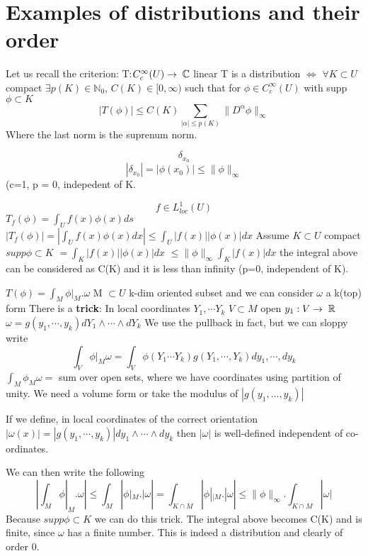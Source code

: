 \section{Examples of distributions and their order}
Let us recall the criterion:
T:$C^{\infty}_{c}(U) \rightarrow \; \mathbb{C}$ linear 
T is a distribution $\iff$ $\forall K \subset U$ compact 
$\exists p(K) \in \mathbb{N}_0$, $C(K) \in [0,\infty)$ such that for 
$\phi \in C^{\infty}_{c}(U)$ with supp$\phi \subset K$
\begin{equation*}
 |T(\phi)| \leq C(K) \sum_{|\alpha|\leq p(K)}\|D^{\alpha}\phi\|_{\infty}
\end{equation*}
Where the last norm is the suprenum norm. 
\begin{ex}
 \begin{equation*}
  \delta_{x_{0}} 
 \end{equation*}
\begin{equation*}
 |\delta_{x_{0}}| = |\phi(x_{0})| \leq \|\phi \|_{\infty}
\end{equation*}
(c=1, p = 0, indepedent of K.
\end{ex}
\begin{ex}
 \begin{equation*}
  f \in L^1_{loc}(U) 
 \end{equation*}
$T_f(\phi) = \int_U f(x) \phi (x) ds$
$|T_f(\phi)| = |\int_U f(x) \phi(x) dx| \leq \int_U|f(x)||\phi(x)|dx$ 
Assume $K \subset U$ compact 
$supp \phi \subset K$ $=\int_K|f(x)||\phi(x)|dx$
$\leq \|\phi\|_\infty \int_K |f(x)|dx$
the integral above can be considered as C(K) and it is less than infinity (p=0, independent of K).
\end{ex}
\begin{ex}
 $T(\phi) = \int_M \phi|_M . \omega$
M $\subset U$ k-dim oriented subset and we can consider $\omega$ a k(top) form
There is a \textbf{trick}: In local coordinates $Y_1,\cdots Y_k$ $V\subset M$ open $y_1: V 
\rightarrow \; \mathbb{R}$
$\omega = g(y_1,\cdots, y_k)dY_1\wedge \cdots \wedge dY_k$
We use the pullback in fact, but we can sloppy write 
\begin{equation*}
 \int_V \phi|_M \omega = \int_V \phi(Y_1 \cdots Y_k)g(Y_1,\cdots,Y_k)dy_1,\cdots, dy_k
\end{equation*}
$\int_M \phi_M \omega =$ sum over open sets, where we have coordinates using partition of unity. We need a volume form or 
take the modulus of $|g(y_1,...,y_k)|$
\begin{rm}
 If we define, in local coordinates of the correct orientation 
$|\omega(x)|=|g(y_1,\cdots,y_k)|dy_1 \wedge \cdots \wedge dy_k$
then $|\omega|$ is well-defined independent of co-ordinates.
\end{rm}
We can then write the following 
\begin{equation*}
 |\int_M \phi|_M . \omega| \leq \int_M|\phi|_M . |\omega| = \int_{K \cap M} |\phi|_{|M}.|\omega| 
\leq \|\phi\|_\infty . \int_{K \cap M} |\omega|
\end{equation*}
Because $supp \phi \subset K$ we can do this trick.
The integral above becomes C(K) and is finite, since $\omega$ has a finite number.
This is indeed a distribution and clearly of order 0.
\end{ex}

